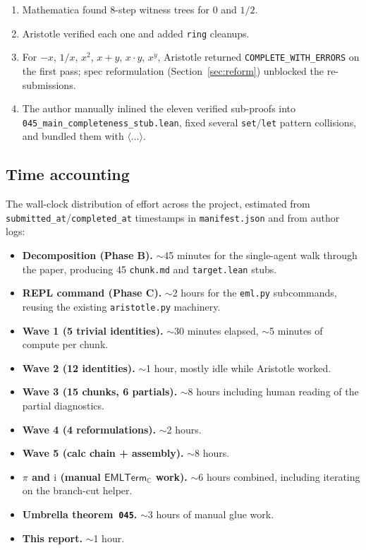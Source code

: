 \documentclass[11pt,a4paper]{article}
\theoremstyle{plain}
\theoremstyle{definition}
\newcommand{\C}{\mathbb{C}}
\newcommand{\imu}{\mathrm{i}}
\newcommand{\EMLTC}{\mathsf{EMLTerm}_\C}
\begin{document}
\begin{enumerate}[leftmargin=*,nosep]
\item Mathematica found 8-step witness trees for $0$ and $1/2$.
\item Aristotle verified each one and added \texttt{ring} cleanups.
\item For $-x$, $1/x$, $x^2$, $x{+}y$, $x\cdot y$, $x^y$, Aristotle
returned \texttt{COMPLETE\_WITH\_ERRORS} on the first pass; spec
reformulation (Section~\ref{sec:reform}) unblocked the
re-submissions.
\item The author manually inlined the eleven verified sub-proofs into
\texttt{045\_main\_completeness\_stub.lean}, fixed several
\texttt{set}/\texttt{let} pattern collisions, and bundled them with
\texttt{$\langle\dots\rangle$}.
\end{enumerate}

\subsection{Time accounting}

The wall-clock distribution of effort across the project, estimated from
\texttt{submitted\_at}/\texttt{completed\_at} timestamps in
\texttt{manifest.json} and from author logs:

\begin{itemize}[leftmargin=*,nosep]
\item \textbf{Decomposition (Phase B).}  $\sim$45 minutes for the
single-agent walk through the paper, producing 45 \texttt{chunk.md}
and \texttt{target.lean} stubs.
\item \textbf{REPL command (Phase C).}  $\sim$2 hours for the
\texttt{eml.py} subcommands, reusing the existing
\texttt{aristotle.py} machinery.
\item \textbf{Wave 1 (5 trivial identities).}  $\sim$30 minutes
elapsed, $\sim$5 minutes of compute per chunk.
\item \textbf{Wave 2 (12 identities).}  $\sim$1 hour, mostly idle while
Aristotle worked.
\item \textbf{Wave 3 (15 chunks, 6 partials).}  $\sim$8 hours including
human reading of the partial diagnostics.
\item \textbf{Wave 4 (4 reformulations).}  $\sim$2 hours.
\item \textbf{Wave 5 (calc chain + assembly).}  $\sim$8 hours.
\item \textbf{$\pi$ and $\imu$ (manual $\EMLTC$ work).}  $\sim$6
hours combined, including iterating on the branch-cut helper.
\item \textbf{Umbrella theorem~\texttt{045}.}  $\sim$3 hours of manual
glue work.
\item \textbf{This report.}  $\sim$1 hour.
\end{itemize}
\end{document}
